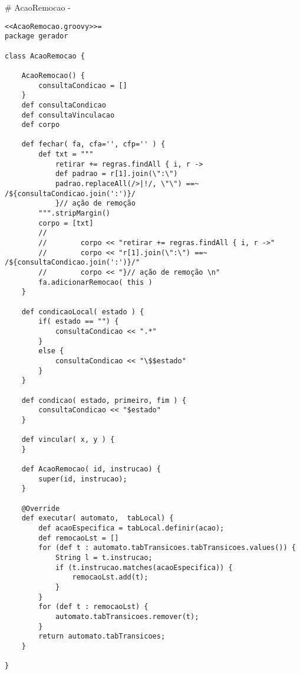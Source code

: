 # AcaoRemocao {-}

\begin{lstlisting}
<<AcaoRemocao.groovy>>=
package gerador

class AcaoRemocao {

    AcaoRemocao() {
        consultaCondicao = []
    }
    def consultaCondicao
    def consultaVinculacao
    def corpo

    def fechar( fa, cfa='', cfp='' ) {
        def txt = """
            retirar += regras.findAll { i, r ->
            def padrao = r[1].join(\":\")
            padrao.replaceAll(/>|!/, \"\") ==~  /${consultaCondicao.join(':')}/
            }// ação de remoção
        """.stripMargin()
        corpo = [txt]
        //
        //        corpo << "retirar += regras.findAll { i, r ->"
        //        corpo << "r[1].join(\":\") ==~  /${consultaCondicao.join(':')}/"
        //        corpo << "}// ação de remoção \n"
        fa.adicionarRemocao( this )
    }

    def condicaoLocal( estado ) {
        if( estado == "") {
            consultaCondicao << ".*"
        }
        else {
            consultaCondicao << "\$$estado"
        }
    }

    def condicao( estado, primeiro, fim ) {
        consultaCondicao << "$estado"
    }

    def vincular( x, y ) {
    }

    def AcaoRemocao( id, instrucao) {
        super(id, instrucao);
    }

    @Override
    def executar( automato,  tabLocal) {
        def acaoEspecifica = tabLocal.definir(acao);
        def remocaoLst = []
        for (def t : automato.tabTransicoes.tabTransicoes.values()) {
            String l = t.instrucao;
            if (t.instrucao.matches(acaoEspecifica)) {
                remocaoLst.add(t);
            }
        }
        for (def t : remocaoLst) {
            automato.tabTransicoes.remover(t);
        }
        return automato.tabTransicoes;
    }

}

\end{lstlisting}

